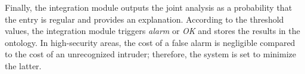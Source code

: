Finally, the integration module outputs the joint analysis as a probability that the entry is regular and provides an explanation. According to the threshold values, the integration module triggers \textit{alarm} or \textit{OK} and stores the results in the ontology. In high-security areas, the cost of a false alarm is negligible compared to the cost of an unrecognized intruder; therefore, the system is set to minimize the latter.


